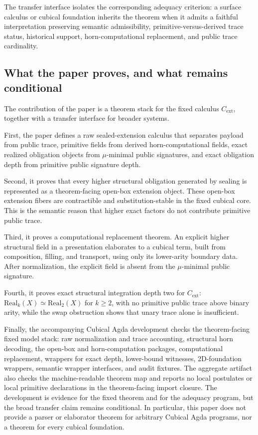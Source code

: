 \documentclass{lmcs}
\begin{document}
The transfer interface isolates the corresponding adequacy criterion: a surface
calculus or cubical foundation inherits the theorem when it admits a faithful
interpretation preserving semantic admissibility, primitive-versus-derived trace
status, historical support, horn-computational replacement, and public trace
cardinality.


\subsection{What the paper proves, and what remains conditional}

The contribution of the paper is a theorem stack for the fixed calculus
\(C_{\mathrm{ext}}\), together with a transfer interface for broader systems.

First, the paper defines a raw sealed-extension calculus that separates payload
from public trace, primitive fields from derived horn-computational fields, exact
realized obligation objects from \(\mu\)-minimal public signatures, and exact
obligation depth from primitive public signature depth.

Second, it proves that every higher structural obligation generated by sealing is
represented as a theorem-facing open-box extension object.  These open-box
extension fibers are contractible and substitution-stable in the fixed cubical
core.  This is the semantic reason that higher exact factors do not contribute
primitive public trace.

Third, it proves a computational replacement theorem.  An explicit higher
structural field in a presentation elaborates to a cubical term, built from
composition, filling, and transport, using only its lower-arity boundary data.
After normalization, the explicit field is absent from the \(\mu\)-minimal public
signature.

Fourth, it proves exact structural integration depth two for \(C_{\mathrm{ext}}\):
\(\mathrm{Real}_k(X) \simeq \mathrm{Real}_2(X)\) for \(k\geq 2\), with no
primitive public trace above binary arity, while the swap obstruction shows that
unary trace alone is insufficient.

Finally, the accompanying Cubical Agda development checks the theorem-facing
fixed model stack: raw normalization and trace accounting, structural horn
decoding, the open-box and horn-computation packages, computational replacement,
wrappers for exact depth, lower-bound witnesses, 2D-foundation wrappers,
semantic wrapper interfaces, and audit fixtures.  The aggregate artifact also
checks the machine-readable theorem map
and reports no local postulates or local primitive declarations in the
theorem-facing import closure.  The development is evidence for the fixed
theorem and for the adequacy program, but the broad transfer claim remains
conditional.  In particular, this paper does not provide a parser or elaborator
theorem for arbitrary Cubical Agda programs, nor a theorem for every cubical
foundation.
\end{document}
